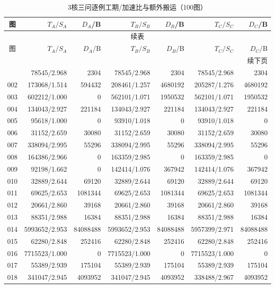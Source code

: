 \begin{longtable}{crrrrrr}
\caption{3核三问逐例工期/加速比与额外搬运（100图）}\label{tab:detail-3}\\
\toprule
图 & $T_A/S_A$ & $D_A$/B & $T_B/S_B$ & $D_B$/B & $T_C/S_C$ & $D_C$/B \\
\midrule
\endfirsthead
\multicolumn{7}{c}{续表}\\
\toprule
图 & $T_A/S_A$ & $D_A$/B & $T_B/S_B$ & $D_B$/B & $T_C/S_C$ & $D_C$/B \\
\midrule
\endhead
\midrule\multicolumn{7}{r}{续下页}\\
\endfoot
\bottomrule
\endlastfoot
001 & 78545/2.968 & 2304 & 78545/2.968 & 2304 & 78545/2.968 & 2304 \\
002 & 173068/1.514 & 594432 & 208461/1.257 & 4680192 & 205287/1.276 & 4680192 \\
003 & 602212/1.000 & 0 & 562101/1.071 & 1950532 & 562101/1.071 & 1950532 \\
004 & 134043/2.927 & 221184 & 134043/2.927 & 221184 & 134043/2.927 & 221184 \\
005 & 95618/1.000 & 0 & 93910/1.018 & 0 & 93910/1.018 & 0 \\
006 & 31152/2.659 & 30080 & 31152/2.659 & 30080 & 31152/2.659 & 30080 \\
007 & 338094/2.995 & 55296 & 338094/2.995 & 55296 & 338094/2.995 & 55296 \\
008 & 164386/2.966 & 0 & 163359/2.985 & 0 & 163359/2.985 & 0 \\
009 & 92198/1.662 & 0 & 142414/1.076 & 367942 & 142414/1.076 & 367942 \\
010 & 32889/2.644 & 69120 & 32889/2.644 & 69120 & 32889/2.644 & 69120 \\
011 & 69625/2.653 & 1081344 & 69625/2.653 & 1081344 & 69625/2.653 & 1081344 \\
012 & 20661/2.860 & 39168 & 20661/2.860 & 39168 & 20661/2.860 & 39168 \\
013 & 88351/2.988 & 16384 & 88351/2.988 & 16384 & 88351/2.988 & 16384 \\
014 & 5993652/2.953 & 84088488 & 5993652/2.953 & 84088488 & 5957399/2.971 & 84088488 \\
015 & 62280/2.848 & 252416 & 62280/2.848 & 252416 & 62280/2.848 & 252416 \\
016 & 7715523/1.000 & 0 & 7715523/1.000 & 0 & 7715523/1.000 & 0 \\
017 & 55389/2.939 & 175104 & 55389/2.939 & 175104 & 55389/2.939 & 175104 \\
018 & 341047/2.945 & 4093952 & 341047/2.945 & 4093952 & 338488/2.967 & 4093952 \\

\end{longtable}
